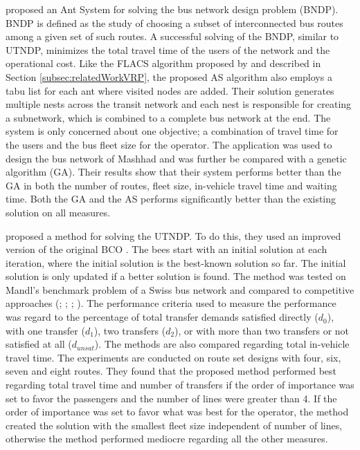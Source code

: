 \citet{poorzahedy11} proposed an Ant System for solving the bus network design problem (BNDP). BNDP is defined as the study of choosing a subset of interconnected bus routes among a given set of such routes. A successful solving of the BNDP, similar to UTNDP, minimizes the total travel time of the users of the network and the operational cost. Like the FLACS algorithm proposed by \citet{salehinejad10} and described in Section \vref{subsec:relatedWorkVRP}, the proposed AS algorithm also employs a tabu list for each ant where visited nodes are added. Their solution generates multiple nests across the transit network and each nest is responsible for creating a subnetwork, which is combined to a complete bus network at the end. The system is only concerned about one objective; a combination of travel time for the users and the bus fleet size for the operator. The application was used to design the bus network of Mashhad and was further be compared with a genetic algorithm (GA). Their results show that their system performs better than the GA in both the number of routes, fleet size, in-vehicle travel time and waiting time. Both the GA and the AS performs significantly better than the existing solution on all measures.  

\citet{nikolic14} proposed a method for solving the UTNDP. To do this, they used an improved version of the original BCO \citep{lucic03}. The bees start with an initial solution at each iteration, where the initial solution is the best-known solution so far. The initial solution is only updated if a better solution is found. The method was tested on Mandl's benchmark problem of a Swiss bus network \citep{mandl80} and compared to competitive approaches (\citet{mandl80}; \citet{shih94}; \citet{baaj95}; \citet{bagloee11}). The performance criteria used to measure the performance was regard to the percentage of total transfer demands satisfied directly ($d_0$), with one transfer ($d_1$), two transfers ($d_2$), or with more than two transfers or not satisfied at all ($d_{unsat}$). The methods are also compared regarding total in-vehicle travel time. The experiments are conducted on route set designs with four, six, seven and eight routes. They found that the proposed method performed best regarding total travel time and number of transfers if the order of importance was set to favor the passengers and the number of lines were greater than 4. If the order of importance was set to favor what was best for the operator, the method created the solution with the smallest fleet size independent of number of lines, otherwise the method performed mediocre regarding all the other measures. 

